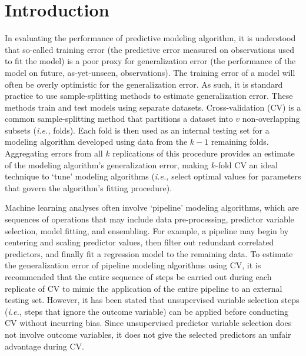 \documentclass[AMA,STIX1COL,doublespace]{WileyNJD-v2}
\begin{document}

\maketitle

\section{Introduction}

In evaluating the performance of predictive modeling algorithm, it is
understood that so-called training error (the predictive error measured
on observations used to fit the model) is a poor proxy for
generalization error (the performance of the model on future,
as-yet-unseen, observations).\citep{kuhn2013applied} The training error
of a model will often be overly optimistic for the generalization error.
As such, it is standard practice to use sample-splitting methods to
estimate generalization error. These methods train and test models using
separate datasets. Cross-validation (CV) is a common sample-splitting
method that partitions a dataset into \(v\) non-overlapping subsets
(\textit{i.e., }folds). Each fold is then used as an internal testing
set for a modeling algorithm developed using data from the \(k-1\)
remaining folds. Aggregating errors from all \(k\) replications of this
procedure provides an estimate of the modeling algorithm's
generalization error, making \(k\)-fold CV an ideal technique to `tune'
modeling algorithms (\textit{i.e., }select optimal values for parameters
that govern the algorithm's fitting procedure).

Machine learning analyses often involve `pipeline' modeling algorithms,
which are sequences of operations that may include data pre-processing,
predictor variable selection, model fitting, and ensembling.\citep{mlr3}
For example, a pipeline may begin by centering and scaling predictor
values, then filter out redundant correlated predictors, and finally fit
a regression model to the remaining data. To estimate the generalization
error of pipeline modeling algorithms using CV, it is recommended that
the entire sequence of steps be carried out during each replicate of CV
to mimic the application of the entire pipeline to an external testing
set. However, it has been stated that unsupervised variable selection
steps (\textit{i.e., }steps that ignore the outcome variable) can be
applied before conducting CV without incurring
bias.\citep{hastie2009elements} Since unsupervised predictor variable
selection does not involve outcome variables, it does not give the
selected predictors an unfair advantage during CV.
\end{document}
